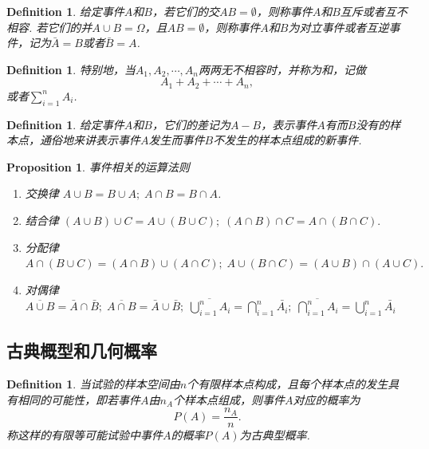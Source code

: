 \documentclass{article}
\newtheorem{proposition}[theorem]{Proposition}
\newtheorem{definition}[theorem]{Definition}
\begin{document}
\begin{definition}
\rm 给定事件$A$和$B$，若它们的交$AB = \emptyset$，则称事件$A$和$B${\color{red}互斥}或者{\color{red}互不相容}. 若它们的并$A\cup B = \Omega$，且$AB=\emptyset$，则称事件$A$和$B$为{\color{red}对立事件}或者{\color{red}互逆事件}，记为$\bar{A} = B$或者$\bar{B} = A$.
\end{definition}

\begin{definition}
\rm 特别地，当$A_1,A_2,\cdots,A_n$两两无不相容时，并称为和，记做
$$
A_1 + A_2 + \cdots + A_n,
$$
或者$\sum\limits_{i=1}^n A_i$. 
\end{definition}

\begin{definition}
\rm 给定事件$A$和$B$，它们的差记为$A-B$，表示事件$A$有而$B$没有的样本点，通俗地来讲表示{\color{red}事件$A$发生而事件$B$不发生}的样本点组成的新事件.
\end{definition}

\begin{proposition}
\rm {\color{red}事件相关的运算法则}
\begin{enumerate}
	\item 交换律 $A \cup B = B \cup A;\;A \cap B = B \cap A$.
	\item 结合律 $(A \cup B) \cup C = A \cup (B \cup C);\; (A \cap B) \cap C = A \cap (B \cap C).$
	\item 分配律 $A \cap (B \cup C) = (A \cap B) \cup (A \cap C);\; A \cup (B \cap C) = (A \cup B) \cap (A \cup C).$
	\item 对偶律 $\overline{A \cup B} = \bar{A} \cap \bar{B};\; \overline{A \cap B} = \bar{A} \cup \bar{B};\; \overline{\bigcup\limits_{i=1}^n A_i} = \bigcap\limits_{i=1}^n \bar{A_i};\; \overline{\bigcap\limits_{i=1}^n A_i} = \bigcup\limits_{i=1}^n \bar{A_i}$ 
\end{enumerate}
\end{proposition}

\subsection{古典概型和几何概率}

\begin{definition}
\rm 当试验的样本空间由$n$个{\color{red}有限}样本点构成，且{\color{red}每个样本点的发生具有相同的可能性}，即若事件$A$由$n_A$个样本点组成，则事件$A$对应的概率为
$$
P(A) = \frac{n_A}{n}.
$$
称这样的有限等可能试验中事件$A$的概率$P(A)$为{\color{red}古典型概率}.
\end{definition}
\end{document}
